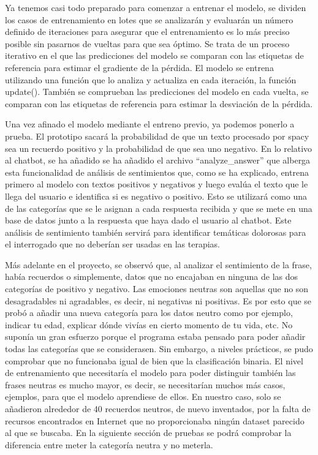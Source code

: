 Ya tenemos casi todo preparado para comenzar a entrenar el modelo, se dividen los casos de entrenamiento en lotes que se analizarán y evaluarán un número definido de iteraciones para asegurar que el entrenamiento es lo más preciso posible sin pasarnos de vueltas para que sea óptimo. Se trata de un proceso iterativo en el que las predicciones del modelo se comparan con las etiquetas de referencia para estimar el gradiente de la pérdida. El modelo se entrena utilizando una función que lo analiza y actualiza en cada iteración, la función update(). También se comprueban las predicciones del modelo en cada vuelta, se comparan con las etiquetas de referencia para estimar la desviación de la pérdida.

Una vez afinado el modelo mediante el entreno previo, ya podemos ponerlo a prueba. El prototipo sacará la probabilidad de que un texto procesado por spacy sea un recuerdo positivo y la probabilidad de que sea uno negativo. En lo relativo al chatbot, se ha añadido se ha añadido el archivo ``analyze\_answer'' que alberga esta funcionalidad de análisis de sentimientos que, como se ha explicado, entrena primero al modelo con textos positivos y negativos y luego evalúa el texto que le llega del usuario e identifica si es negativo o positivo. Esto se utilizará como una de las categorías que se le asignan a cada respuesta recibida y que se mete en una base de datos junto a la respuesta que haya dado el usuario al chatbot. Este análisis de sentimiento también servirá para identificar temáticas dolorosas para el interrogado que no deberían ser usadas en las terapias.

Más adelante en el proyecto, se observó que, al analizar el sentimiento de la frase, había recuerdos o simplemente, datos que no encajaban en ninguna de las dos categorías de positivo y negativo. Las emociones neutras son aquellas que no son desagradables ni agradables, es decir, ni negativas ni positivas. Es por esto que se probó a añadir una nueva categoría para los datos neutro como por ejemplo, indicar tu edad, explicar dónde vivías en cierto momento de tu vida, etc. No suponía un gran esfuerzo porque el programa estaba pensado para poder añadir todas las categorías que se considerasen. Sin embargo, a niveles prácticos, se pudo comprobar que no funcionaba igual de bien que la clasificación binaria. El nivel de entrenamiento que necesitaría el modelo para poder distinguir también las frases neutras es mucho mayor, es decir, se necesitarían muchos más casos, ejemplos, para que el modelo aprendiese de ellos. En nuestro caso, solo se añadieron alrededor de 40 recuerdos neutros, de nuevo inventados, por la falta de recursos encontrados en Internet que no proporcionaba ningún dataset parecido al que se buscaba. En la siguiente sección de pruebas se podrá comprobar la diferencia entre meter la categoría neutra y no meterla. 

